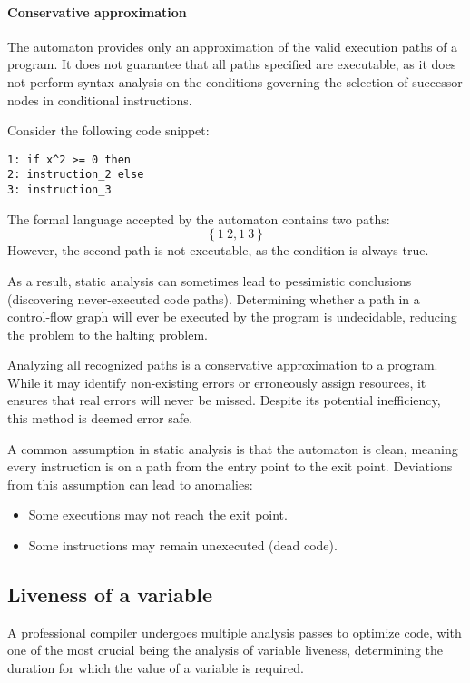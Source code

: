 \paragraph*{Conservative approximation}
The automaton provides only an approximation of the valid execution paths of a program. 
It does not guarantee that all paths specified are executable, as it does not perform syntax analysis on the conditions governing the selection of successor nodes in conditional instructions.
\begin{example}
    Consider the following code snippet: 
    \begin{verbatim}
1: if x^2 >= 0 then
2: instruction_2 else
3: instruction_3
    \end{verbatim}
    The formal language accepted by the automaton contains two paths:
    \[ \left\{ 1 \: 2,  1 \: 3 \right\} \]
    However, the second path is not executable, as the condition is always true.
\end{example}
As a result, static analysis can sometimes lead to pessimistic conclusions (discovering never-executed code paths). 
Determining whether a path in a control-flow graph will ever be executed by the program is undecidable, reducing the problem to the halting problem.

Analyzing all recognized paths is a conservative approximation to a program. 
While it may identify non-existing errors or erroneously assign resources, it ensures that real errors will never be missed. 
Despite its potential inefficiency, this method is deemed error safe.

A common assumption in static analysis is that the automaton is clean, meaning every instruction is on a path from the entry point to the exit point. 
Deviations from this assumption can lead to anomalies:
\begin{itemize}
    \item Some executions may not reach the exit point.
    \item Some instructions may remain unexecuted (dead code).
\end{itemize}

\subsection{Liveness of a variable}
A professional compiler undergoes multiple analysis passes to optimize code, with one of the most crucial being the analysis of variable liveness, determining the duration for which the value of a variable is required.

